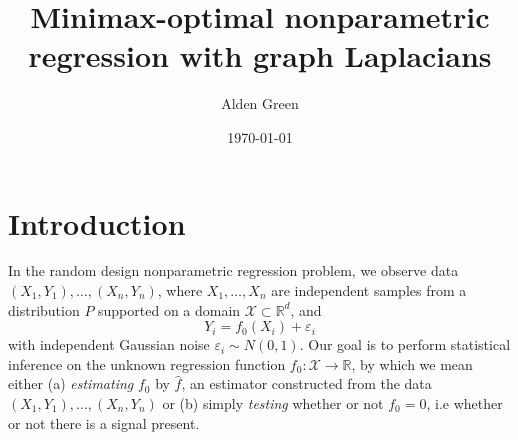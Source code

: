 \documentclass{article}
\newcommand{\Reals}{\mathbb{R}}
\newcommand{\1}{\mathbf{1}}
\newcommand{\Rd}{\Reals^d}
\newcommand{\Xset}{\mathcal{X}}
\newcommand{\wh}[1]{\widehat{#1}}
\theoremstyle{alden}
\theoremstyle{aldenthm}
\theoremstyle{definition}
\theoremstyle{remark}
\begin{document}
\title{Minimax-optimal nonparametric regression with graph Laplacians}
\author{Alden Green}
\date{\today}
\maketitle

\section{Introduction}
\label{sec:introduction}

In the random design nonparametric regression problem, we observe data $(X_1,Y_1),\ldots,(X_n,Y_n)$, where $X_1,\ldots,X_n$ are independent samples from a distribution $P$ supported on a domain $\Xset \subset \Rd$, and 
\begin{equation}
\label{eqn:random_design_regression}
Y_i = f_0(X_i) + \varepsilon_i
\end{equation}
with independent Gaussian noise $\varepsilon_i \sim N(0,1)$. Our goal is to perform statistical inference on the unknown regression function $f_0: \Xset \to \Reals$, by which we mean either (a) \emph{estimating} $f_0$ by $\wh{f}$, an estimator constructed from the data $(X_1,Y_1),\ldots,(X_n,Y_n)$ or (b) simply \emph{testing} whether or not $f_0 = 0$, i.e whether or not there is a signal present. 
\end{document}
